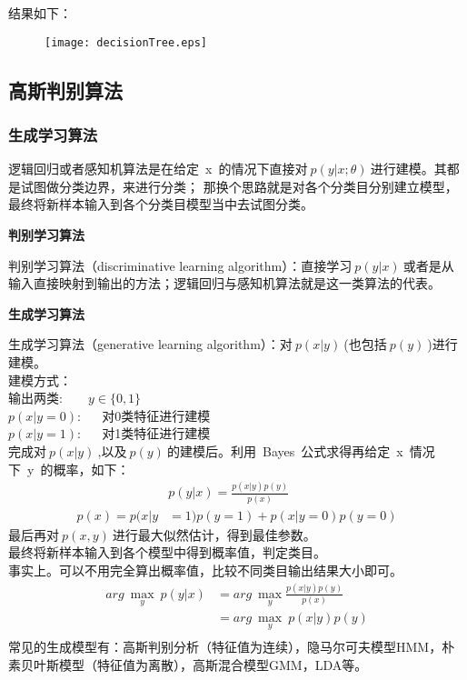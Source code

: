 结果如下：
\begin{figure}[!h]
  \centering
  \texttt{[image: decisionTree.eps]}
\end{figure}


\newpage


\subsection{高斯判别算法}
\subsubsection{生成学习算法}
逻辑回归或者感知机算法是在给定~x~的情况下直接对$~p(y|x;\theta)~$进行建模。其都是试图做分类边界，来进行分类；
那换个思路就是对各个分类目分别建立模型，最终将新样本输入到各个分类目模型当中去试图分类。

\noindent\textbf{判别学习算法}\par
判别学习算法（discriminative learning algorithm）：直接学习$~p(y|x)~$或者是从输入直接映射到输出的方法；逻辑回归与感知机算法就是这一类算法的代表。

\noindent\textbf{生成学习算法}\par
生成学习算法（generative learning algorithm）：对$~p(x|y)~$(也包括$~p(y)~$)进行建模。\\
建模方式：\\
输出两类:~~~~$y\in\{0,1\}$\\
$p(x|y=0):$~~~对0类特征进行建模\\
$p(x|y=1):$~~~对1类特征进行建模\\
完成对$~p(x|y)~$,以及$~p(y)~$的建模后。利用~Bayes~公式求得再给定~x~情况下~y~的概率，如下：
\begin{equation}\nonumber
\begin{split}
  &p(y|x)=\frac{p(x|y)p(y)}{p(x)}\\
  p(x)=p(x|y&=1)p(y=1)+p(x|y=0)p(y=0)
\end{split}
\end{equation}
最后再对$~p(x,y)~$进行最大似然估计，得到最佳参数。\\
最终将新样本输入到各个模型中得到概率值，判定类目。\\
事实上。可以不用完全算出概率值，比较不同类目输出结果大小即可。
\begin{equation}\nonumber
\begin{split}
  arg~\mathop{max}_y~p(y|x)&=arg~\mathop{max}_y\frac{p(x|y)p(y)}{p(x)}\\
  &=arg~\mathop{max}_y~p(x|y)p(y)\\
\end{split}
\end{equation}
常见的生成模型有：高斯判别分析（特征值为连续），隐马尔可夫模型HMM，朴素贝叶斯模型（特征值为离散），高斯混合模型GMM，LDA等。

